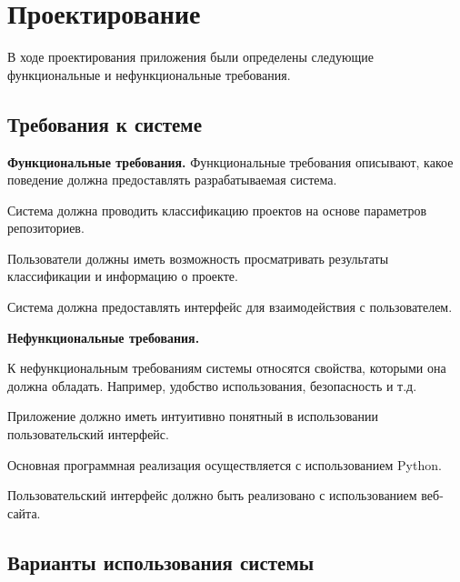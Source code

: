 \lstset{language=C, frame=L, basicstyle=\footnotesize,%
	keywordstyle=\bfseries, showstringspaces=false, xleftmargin=\parindent, numbers=none, numberstyle=\tiny, stepnumber=2, numbersep=14pt}
\newpage
\section{Проектирование}
\label{sec:Design}
В ходе проектирования приложения были определены следующие функциональные и нефункциональные требования.
\subsection{Требования к системе}
\label{sec:Requirements}
\textbf{Функциональные требования.}
Функциональные требования описывают, какое поведение должна предоставлять разрабатываемая система.

 \begin{itemizecustom}
 \item Система должна проводить классификацию проектов на основе параметров репозиториев.
 
 \item Пользователи должны иметь возможность просматривать результаты классификации и информацию о проекте.
 
 \item Система должна предоставлять интерфейс для взаимодействия с пользователем.
 \end{itemizecustom}

\textbf{Нефункциональные требования.}

К нефункциональным требованиям системы относятся свойства, которыми она должна обладать. Например, удобство использования, безопасность и т.д.

 \begin{itemizecustom}
 \item Приложение должно иметь интуитивно понятный в использовании пользовательский интерфейс.
 
 \item Основная программная реализация осуществляется с использованием Python.
 
 \item Пользовательский интерфейс должно быть реализовано с использованием веб-сайта.
 \end{itemizecustom}

\subsection{Варианты использования системы}
\label{sec:Using}

